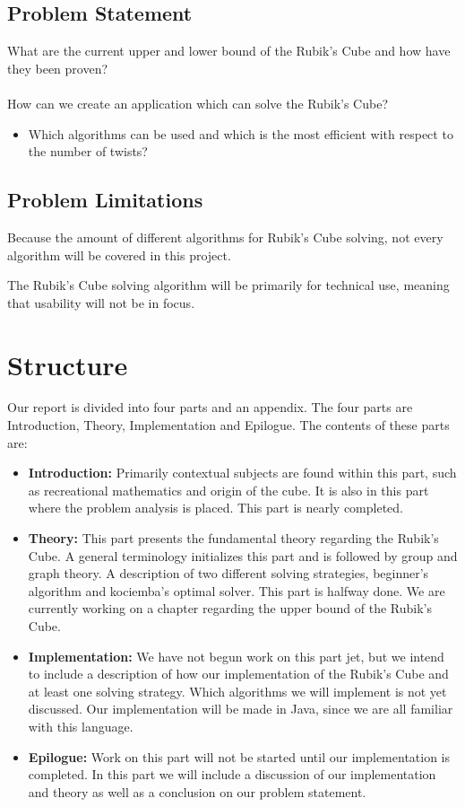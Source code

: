\documentclass{article}
\begin{document}
\subsection{Problem Statement}
What are the current upper and lower bound of the Rubik's Cube and how have they been proven? \\
\\
How can we create an application which can solve the Rubik's Cube?
\begin{itemize}
	\item Which algorithms can be used and which is the most efficient with respect to the number of twists?
\end{itemize}

\subsection{Problem Limitations}
Because the amount of different algorithms for Rubik's Cube solving, not every algorithm will be covered in this project.

The Rubik's Cube solving algorithm will be primarily for technical use, meaning that usability will not be in focus.

\section{Structure}
Our report is divided into four parts and an appendix. The four parts are Introduction, Theory, Implementation and Epilogue.
The contents of these parts are:
\begin{itemize}
	\item \textbf{Introduction:} Primarily contextual subjects are found within this part, such as recreational mathematics and origin of the cube. It is also in this part where the problem analysis is placed. This part is nearly completed.
	
	\item \textbf{Theory:} This part presents the fundamental theory regarding the Rubik's Cube. A general terminology initializes this part and is followed by group and graph theory. A description of two different solving strategies, beginner's algorithm and kociemba's optimal solver. This part is halfway done. We are currently working on a chapter regarding the upper bound of the Rubik's Cube.
	
	\item \textbf{Implementation:} We have not begun work on this part jet, but we intend to include a description of how our implementation of the Rubik's Cube and at least one solving strategy. Which algorithms we will implement is not yet discussed.
	 Our implementation will be made in Java, since we are all familiar with this language.
	\item \textbf{Epilogue:} Work on this part will not be started until our implementation is completed. In this part we will include a discussion of our implementation and theory as well as a conclusion on our problem statement.
\end{itemize}
\end{document}
